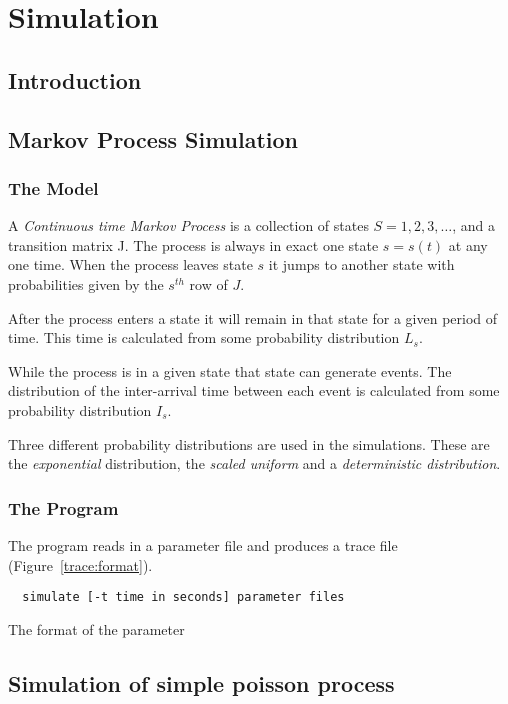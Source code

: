 \chapter{Simulation}

\section{Introduction}

\section{Markov Process Simulation}

\subsection{The Model}

A {\em Continuous time Markov Process} is a collection of states $S =
{1,2,3,\ldots}$, and a transition matrix J.  The process is always in
exact one state $s = s(t)$ at any one time.  When the process leaves
state $s$ it jumps to another state with probabilities given by the
$s^{th}$ row of $J$.

After the process enters a state it will remain in that state for a
given period of time.  This time is calculated from some probability
distribution $L_s$.

While the process is in a given state that state can generate events.
The distribution of the inter-arrival time between each event is
calculated from some probability distribution $I_s$.

Three different probability distributions are used in the simulations.
These are the {\em exponential} distribution, the {\em scaled uniform}
and a {\em deterministic distribution}.

\subsection{The Program}

The program reads in a parameter file and produces a trace file
(Figure~\ref{trace:format}).

\begin{verbatim}
  simulate [-t time in seconds] parameter files
\end{verbatim}

The format of the parameter 

\section{Simulation of simple poisson process}

